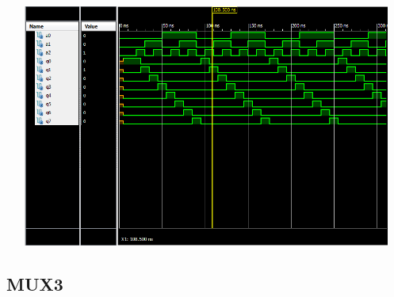 \documentclass{article}
\begin{document}
\includegraphics[width=16cm, height=8cm]{test_decoder.png}

\pagebreak

\subsection{MUX3}\label{sec:result}
\end{document}
